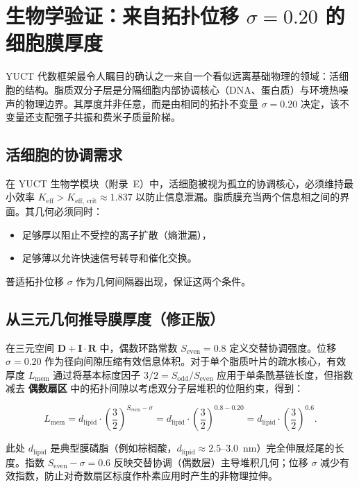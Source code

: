 \documentclass[12pt,a4paper]{article}
\begin{document}
	\section*{生物学验证：来自拓扑位移 \(\sigma = 0.20\) 的细胞膜厚度}
	\label{sec:membrane}
	
	YUCT 代数框架最令人瞩目的确认之一来自一个看似远离基础物理的领域：活细胞的结构。脂质双分子层是分隔细胞内部协调核心（DNA、蛋白质）与环境热噪声的物理边界。其厚度并非任意，而是由相同的拓扑不变量 \(\sigma = 0.20\) 决定，该不变量还支配强子共振和费米子质量阶梯。
	
	\subsection*{活细胞的协调需求}
	
	在 YUCT 生物学模块（附录~E）中，活细胞被视为孤立的协调核心，必须维持最小效率 \(K_{\mathrm{eff}} > K_{\mathrm{eff,\,crit}} \approx 1.837\) 以防止信息泄漏。脂质膜充当两个信息相之间的界面。其几何必须同时：
	\begin{itemize}
		\item 足够厚以阻止不受控的离子扩散（熵泄漏），
		\item 足够薄以允许快速信号转导和催化交换。
	\end{itemize}
	普适拓扑位移 \(\sigma\) 作为几何间隔器出现，保证这两个条件。
	
	\subsection*{从三元几何推导膜厚度（修正版）}
	
	在三元空间 \(\mathbf{D} + \mathbf{I}\!\cdot\!\mathbf{R}\) 中，偶数环路常数 \(S_{\mathrm{even}} = 0.8\) 定义交替协调强度。位移 \(\sigma = 0.20\) 作为径向间隙压缩有效信息体积。对于单个脂质叶片的疏水核心，有效厚度 \(L_{\mathrm{mem}}\) 通过将基本标度因子 \(3/2 = S_{\mathrm{odd}}/S_{\mathrm{even}}\) 应用于单条酰基链长度，但指数减去 \textbf{偶数扇区} 中的拓扑间隙以考虑双分子层堆积的位阻约束，得到：
	
	\[
	L_{\mathrm{mem}} = d_{\mathrm{lipid}} \cdot \left( \frac{3}{2} \right)^{S_{\mathrm{even}} - \sigma}
	= d_{\mathrm{lipid}} \cdot \left( \frac{3}{2} \right)^{0.8 - 0.20}
	= d_{\mathrm{lipid}} \cdot \left( \frac{3}{2} \right)^{0.6}.
	\]
	
	此处 \(d_{\mathrm{lipid}}\) 是典型膜磷脂（例如棕榈酸，\(d_{\mathrm{lipid}} \approx 2.5\)–\(3.0\)~nm）完全伸展烃尾的长度。指数 \(S_{\mathrm{even}} - \sigma = 0.6\) 反映交替协调（偶数层）主导堆积几何；位移 \(\sigma\) 减少有效指数，防止对奇数扇区标度作朴素应用时产生的非物理拉伸。
	
\end{document}
